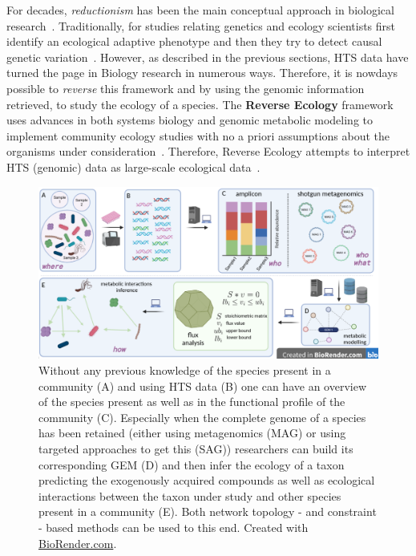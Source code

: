       For decades, \textit{reductionism} has been the main conceptual approach 
      in biological research~\cite{noble2008music}.
      Traditionally, for studies relating genetics and ecology
      scientists first identify an ecological adaptive phenotype 
      and then they try to detect causal genetic variation~\cite{noble2008music}.
      However, as described in the previous sections, HTS data have turned the page in 
      Biology research in numerous ways. 
      Therefore, it is nowdays possible to \textit{reverse} this framework and by 
      using the genomic information retrieved, to study 
      the ecology of a species.
      The \textbf{Reverse Ecology} framework uses advances 
      in both systems biology and genomic metabolic modeling to implement  
      community ecology studies 
      with no a priori assumptions about the organisms under consideration~\cite{cao2016revecor}.
      Therefore, Reverse Ecology 
      attempts to interpret HTS (genomic) data as large-scale ecological data~\cite{levy2012reverse}.

      \begin{figure}[!h]
         \centering
         \includegraphics[width=135mm]{figures/reverse_ecology.png}
         \caption[The \textit{Reverse Ecology} framework.]{Without any previous knowledge of the species present in a community (A) and using HTS data (B) one can have an overview of the species present 
         as well as in the functional profile of the community (C).
         Especially when the complete genome of a species has been retained (either using 
         metagenomics (MAG) or using targeted approaches to get this (SAG))
         researchers can build its corresponding GEM (D) and then 
         infer the ecology of a taxon predicting 
         the exogenously acquired compounds as well as ecological interactions between the taxon under study and other species present in a community (E). 
         Both network topology - and constraint - based methods can be used to this end.
         Created with \href{BioRender.com}{BioRender.com}.
         }
         \label{fig:revecol}
      \end{figure}

